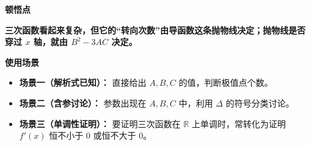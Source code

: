 \begin{explanationbox}
	\medskip
	\textbf{\textcolor{CExplanation}{顿悟点}}

	\textbf{三次函数看起来复杂，但它的“转向次数”由导函数这条抛物线决定；抛物线是否穿过 $x$ 轴，就由 $B^2-3AC$ 决定。}

	\medskip
	\textbf{\textcolor{CExplanation}{使用场景}}
	\begin{itemize}[leftmargin=*, itemsep=0.5em, topsep=0.4em]
		\item \textbf{场景一（解析式已知）：} 直接给出 $A,B,C$ 的值，判断极值点个数。
		\item \textbf{场景二（含参讨论）：} 参数出现在 $A,B,C$ 中，利用 $\Delta$ 的符号分类讨论。
		\item \textbf{场景三（单调性证明）：} 要证明三次函数在 $\mathbb{R}$ 上单调时，常转化为证明 $f'(x)$ 恒不小于 $0$ 或恒不大于 $0$。
	\end{itemize}
\end{explanationbox}
